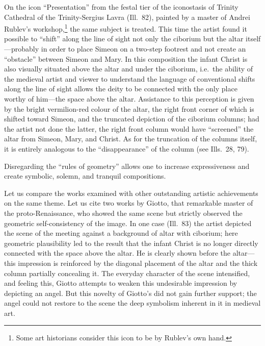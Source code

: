 

On the icon ``Presentation'' from the festal tier of the iconostasis of Trinity Cathedral
of the Trinity-Sergius Lavra (Ill.~82), painted by a master of Andrei Rublev's
workshop,\footnote{Some art historians consider this icon to be by Rublev's own hand.}
the same subject is treated.  This time the artist found it possible to ``shift'' along
the line of sight not only the ciborium but the altar itself---probably in order to place
Simeon on a two-step footrest and not create an ``obstacle'' between Simeon and Mary.  In
this composition the infant Christ is also visually situated above the altar and under
the ciborium, i.e.\ the ability of the medieval artist and viewer to understand the
language of conventional shifts along the line of sight allows the deity to be connected
with the only place worthy of him---the space above the altar.  Assistance to this
perception is given by the bright vermilion-red colour of the altar, the right front
corner of which is shifted toward Simeon, and the truncated depiction of the ciborium
columns; had the artist not done the latter, the right front column would have
``screened'' the altar from Simeon, Mary, and Christ.  As for the truncation of the
columns itself, it is entirely analogous to the ``disappearance'' of the column (see
Ills.~28, 79).




Disregarding the ``rules of geometry'' allows one to increase expressiveness and create
symbolic, solemn, and tranquil compositions.

Let us compare the works examined with other outstanding artistic achievements on the
same theme.  Let us cite two works by Giotto, that remarkable master of the
proto-Renaissance, who showed the same scene but strictly observed the geometric
self-consistency of the image.  In one case (Ill.~83) the artist depicted the scene of
the meeting against a background of altar with ciborium; here geometric plausibility led
to the result that the infant Christ is no longer directly connected with the space above
the altar.  He is clearly shown before the altar---this impression is reinforced by the
diagonal placement of the altar and the thick column partially concealing it.  The
everyday character of the scene intensified, and feeling this, Giotto attempts to weaken
this undesirable impression by depicting an angel.  But this novelty of Giotto's did not
gain further support; the angel could not restore to the scene the deep symbolism
inherent in it in medieval art.

